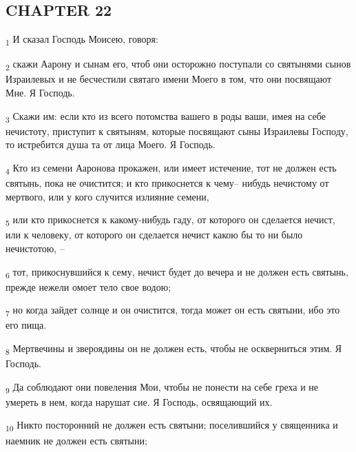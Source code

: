 \subsection{CHAPTER 22}
\begin{tcolorbox}
\textsubscript{1} И сказал Господь Моисею, говоря:
\end{tcolorbox}
\begin{tcolorbox}
\textsubscript{2} скажи Аарону и сынам его, чтоб они осторожно поступали со святынями сынов Израилевых и не бесчестили святаго имени Моего в том, что они посвящают Мне. Я Господь.
\end{tcolorbox}
\begin{tcolorbox}
\textsubscript{3} Скажи им: если кто из всего потомства вашего в роды ваши, имея на себе нечистоту, приступит к святыням, которые посвящают сыны Израилевы Господу, то истребится душа та от лица Моего. Я Господь.
\end{tcolorbox}
\begin{tcolorbox}
\textsubscript{4} Кто из семени Ааронова прокажен, или имеет истечение, тот не должен есть святынь, пока не очистится; и кто прикоснется к чему-- нибудь нечистому от мертвого, или у кого случится излияние семени,
\end{tcolorbox}
\begin{tcolorbox}
\textsubscript{5} или кто прикоснется к какому-нибудь гаду, от которого он сделается нечист, или к человеку, от которого он сделается нечист какою бы то ни было нечистотою, --
\end{tcolorbox}
\begin{tcolorbox}
\textsubscript{6} тот, прикоснувшийся к сему, нечист будет до вечера и не должен есть святынь, прежде нежели омоет тело свое водою;
\end{tcolorbox}
\begin{tcolorbox}
\textsubscript{7} но когда зайдет солнце и он очистится, тогда может он есть святыни, ибо это его пища.
\end{tcolorbox}
\begin{tcolorbox}
\textsubscript{8} Мертвечины и звероядины он не должен есть, чтобы не оскверниться этим. Я Господь.
\end{tcolorbox}
\begin{tcolorbox}
\textsubscript{9} Да соблюдают они повеления Мои, чтобы не понести на себе греха и не умереть в нем, когда нарушат сие. Я Господь, освящающий их.
\end{tcolorbox}
\begin{tcolorbox}
\textsubscript{10} Никто посторонний не должен есть святыни; поселившийся у священника и наемник не должен есть святыни;
\end{tcolorbox}
